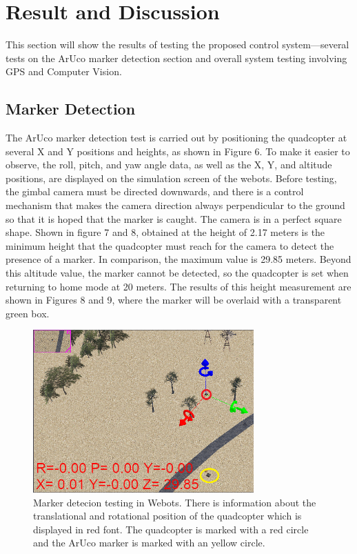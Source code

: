 \documentclass[a4paper]{jpconf}
\begin{document}
\section{Result and Discussion}
This section will show the results of testing the proposed control system—several tests on the ArUco marker detection section and overall system testing involving GPS and Computer Vision.

\subsection{Marker Detection}
The ArUco marker detection test is carried out by positioning the quadcopter at several X and Y positions and heights, as shown in Figure 6. To make it easier to observe, the roll, pitch, and yaw angle data, as well as the X, Y, and altitude positions, are displayed on the simulation screen of the webots. Before testing, the gimbal camera must be directed downwards, and there is a control mechanism that makes the camera direction always perpendicular to the ground so that it is hoped that the marker is caught. The camera is in a perfect square shape. Shown in figure 7 and 8, obtained at the height of 2.17 meters is the minimum height that the quadcopter must reach for the camera to detect the presence of a marker. In comparison, the maximum value is 29.85 meters. Beyond this altitude value, the marker cannot be detected, so the quadcopter is set when returning to home mode at 20 meters. The results of this height measurement are shown in Figures 8 and 9, where the marker will be overlaid with a transparent green box.

\begin{figure}[h]
    \centering
    \includegraphics[width=20pc]{marker-detection-testing-edit.png}
    \caption{\label{label}Marker detecion testing in Webots. There is information about the translational and rotational position of the quadcopter which is displayed in red font. The quadcopter is marked with a red circle and the ArUco marker is marked with an yellow circle.}
\end{figure}
\end{document}
